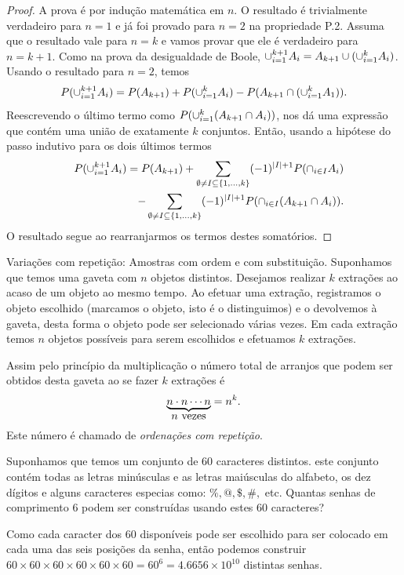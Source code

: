 \begin{frame}
\begin{proof} A prova é por indução matemática em $n$. O resultado é
trivialmente verdadeiro para $n=1$ e já foi provado para $n=2$ na propriedade P.2. Assuma que o resultado vale para $n=k$ e
vamos provar que ele é verdadeiro para $n=k+1$. Como na prova da
desigualdade de Boole, $\cup_{i=1}^{k+1}A_i=A_{k+1}\cup
(\cup_{i=1}^{k}A_i)$. Usando o resultado para $n=2$, temos
$$P(\cup_{i=1}^{k+1}A_i)=P(A_{k+1})+P(\cup_{i=1}^{k}A_i)-P(A_{k+1}\cap (\cup_{i=1}^{k}A_1)).$$
Reescrevendo o último termo como $P(\cup_{i=1}^{k}(A_{k+1}\cap
A_i))$, nos dá uma expressão que contém uma união de exatamente $k$
conjuntos. Então, usando a hipótese do passo indutivo para os dois
últimos termos
\begin{eqnarray}
& & P(\cup_{i=1}^{k+1}A_i)=P(A_{k+1})+\sum_{\emptyset\ne I\subseteq\{1,\ldots,k\}}(-1)^{|I|+1}P(\cap_{i\in I}A_i)\nonumber\\
& & -\sum_{\emptyset\ne I\subseteq\{1,\ldots,k\}}(-1)^{|I|+1}P(\cap_{i\in I}(A_{k+1}\cap A_i)).
\nonumber\end{eqnarray}
O resultado segue ao rearranjarmos os termos destes somatórios.
\end{proof}
\end{frame}





\begin{frame}{Variações com repetição: Amostras com ordem e com substituição.} Suponhamos que temos uma gaveta com $n$  objetos distintos. Desejamos realizar $k$ extrações ao acaso de um objeto ao mesmo tempo. Ao efetuar uma extração, registramos o objeto escolhido (marcamos o objeto, isto é o distinguimos) e o devolvemos à gaveta, desta forma o objeto pode ser selecionado várias vezes. Em cada extração temos $n$ objetos possíveis para serem escolhidos e efetuamos $k$ extrações. 

Assim pelo princípio da multiplicação o número total de arranjos que podem ser obtidos desta gaveta ao se fazer $k$ extrações é 
$$\displaystyle{\underbrace{n\cdot n\cdots n}_{\text{\normalsize $n$ vezes}}=n^k.}$$ 
Este número é chamado de {\it ordenações com repetição}. 

\begin{exem}
Suponhamos que temos um conjunto de 60 caracteres distintos. este conjunto contém todas as letras minúsculas e as letras maiúsculas do alfabeto, os dez dígitos e alguns caracteres especias como: $\%, @, \$, \#,$ etc. Quantas senhas de comprimento 6 podem ser construídas usando estes 60 caracteres?

Como cada caracter dos 60 disponíveis pode ser escolhido para ser colocado em cada uma das seis posições da senha, então podemos construir $60 \times 60 \times 60 \times 60 \times 60 \times 60= 60^6 =4.6656\times 10^{10} $ distintas senhas.
\end{exem}


\end{frame}

